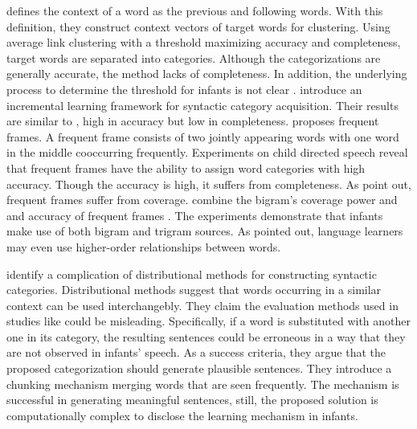 \cite{Redington98distributionalinformation} defines the context of
a word as the previous and following words. With this definition, they construct
context vectors of target words for clustering. Using average link clustering
with a threshold maximizing accuracy and completeness, target  words are
separated into categories. Although the categorizations are generally accurate,
the method lacks of completeness. In addition, the underlying process to determine
the threshold for infants is not clear \citep*{ambridge2011child}. \cite{cartwright1997syntactic} introduce an incremental learning framework for syntactic category acquisition. 
Their results are similar to \cite{Redington98distributionalinformation}, high in 
accuracy but low in completeness. %
\cite{Mintz200391} proposes frequent frames. A frequent frame consists of two jointly appearing words with one word in the middle cooccurring frequently. Experiments on child directed speech reveal that 
frequent frames have the ability to assign word categories with high
accuracy. Though the accuracy is high, it suffers from
completeness. As \cite{clair2010} point out, frequent frames suffer from coverage.
\cite{clair2010} combine the bigram's 
coverage power \citep*{Redington98distributionalinformation} and \citep*{monaghan2008integration}
 and accuracy of frequent frames \citep*{Mintz200391}. The 
experiments demonstrate that infants make use of both bigram and 
trigram sources. As \cite{clair2010} pointed out, language learners may even use higher-order 
relationships between words.

\cite{freudenthal2005resolution} identify a complication of distributional
methods for constructing syntactic categories. Distributional methods suggest 
that words occurring in a similar context can be used interchangebly. They 
claim the evaluation methods used in studies like \citep*{Redington98distributionalinformation, monaghan2008integration,Mintz200391} could be misleading. Specifically, if a word is substituted with another one in its
category, the resulting sentences could be erroneous in a way that they are not observed in
infants' speech. As a success criteria, they argue that the proposed categorization
should generate plausible sentences. They introduce a chunking mechanism merging 
words that are seen frequently. The mechanism is successful in generating meaningful sentences, still, the
proposed solution is computationally complex to disclose the learning mechanism
in infants.

